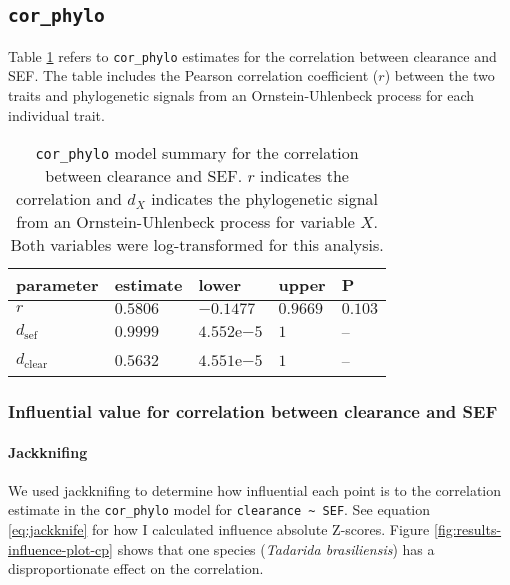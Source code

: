 \documentclass[12pt,]{article}
\let\oldparagraph\paragraph
\renewcommand{\paragraph}[1]{\oldparagraph{#1}\mbox{}}
\begin{document}
\FloatBarrier

\hypertarget{cor_phylo}{%
\subsection{\texorpdfstring{\texttt{cor\_phylo}}{cor\_phylo}}\label{cor_phylo}}

Table \ref{tab:results-clear-sef-kable}
refers to \texttt{cor\_phylo} estimates for the correlation between clearance and SEF.
The table includes the Pearson correlation coefficient (\(r\)) between the two traits
and phylogenetic signals from an Ornstein-Uhlenbeck process for each individual trait.

\begin{table}[t]

\caption{\label{tab:results-clear-sef-kable}\texttt{cor\_phylo} model summary for the correlation between clearance and SEF. $r$ indicates the correlation and $d_X$ indicates the phylogenetic signal from an Ornstein-Uhlenbeck process for variable $X$. Both variables were log-transformed for this analysis.}
\centering
\begin{tabular}{lllll}
\toprule
parameter & estimate & lower & upper & P\\
\midrule
$r$ & $0.5806$ & $-0.1477$ & $0.9669$ & $0.103$\\
$d_{\text{sef}}$ & $0.9999$ & $4.552 \mathrm{e}{-5}$ & $1$ & –\\
$d_{\text{clear}}$ & $0.5632$ & $4.551 \mathrm{e}{-5}$ & $1$ & –\\
\bottomrule
\end{tabular}
\end{table}

\hypertarget{influential-value-for-correlation-between-clearance-and-sef}{%
\subsubsection{Influential value for correlation between clearance and SEF}\label{influential-value-for-correlation-between-clearance-and-sef}}

\hypertarget{jackknifing-2}{%
\paragraph{Jackknifing}\label{jackknifing-2}}

We used jackknifing to determine how influential each point is to the correlation
estimate in the \texttt{cor\_phylo} model for \texttt{clearance\ \textasciitilde{}\ SEF}.
See equation \ref{eq:jackknife} for how I calculated influence absolute Z-scores.
Figure \ref{fig:results-influence-plot-cp} shows that one species
(\emph{Tadarida brasiliensis}) has a disproportionate effect on the correlation.
\end{document}
